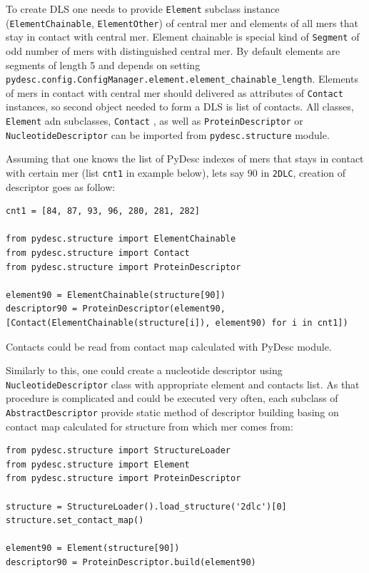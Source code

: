 \documentclass{article}
\begin{document}
To create DLS one needs to provide \texttt{Element} subclass instance (\texttt{ElementChainable}, \texttt{ElementOther}) of central mer and elements of all mers that stay in contact with central mer. Element chainable is special kind of \texttt{Segment} of odd number of mers with distinguished central mer. By default elements are segments of length 5 and depends on setting \texttt{pydesc.config.ConfigManager.element.element\_{}chainable\_{}length}.
Elements of mers in contact with central mer should delivered as attributes of \texttt{Contact} instances, so second object needed to form a DLS is list of contacts.
All classes, \texttt{Element} adn subclasses, \texttt{Contact} , as well as \texttt{ProteinDescriptor} or \texttt{NucleotideDescriptor} can be imported from \texttt{pydesc.structure} module.

Assuming that one knows the list of PyDesc indexes of mers that stays in contact with certain mer (list \texttt{cnt1} in example below), lets say 90 in \texttt{2DLC}, creation of descriptor goes as follow:

\begin{lstlisting}
cnt1 = [84, 87, 93, 96, 280, 281, 282]

from pydesc.structure import ElementChainable
from pydesc.structure import Contact
from pydesc.structure import ProteinDescriptor

element90 = ElementChainable(structure[90])
descriptor90 = ProteinDescriptor(element90, [Contact(ElementChainable(structure[i]), element90) for i in cnt1])
\end{lstlisting}

Contacts could be read from contact map calculated with PyDesc module.

Similarly to this, one could create a nucleotide descriptor using \texttt{NucleotideDescriptor} class with appropriate element and contacts list. As that procedure is complicated and could be executed very often, each subclass of \texttt{AbstractDescriptor} provide static method of descriptor building basing on contact map calculated for structure from which mer comes from:

\begin{lstlisting}
from pydesc.structure import StructureLoader
from pydesc.structure import Element
from pydesc.structure import ProteinDescriptor

structure = StructureLoader().load_structure('2dlc')[0]
structure.set_contact_map()

element90 = Element(structure[90])
descriptor90 = ProteinDescriptor.build(element90)
\end{lstlisting}
\end{document}
